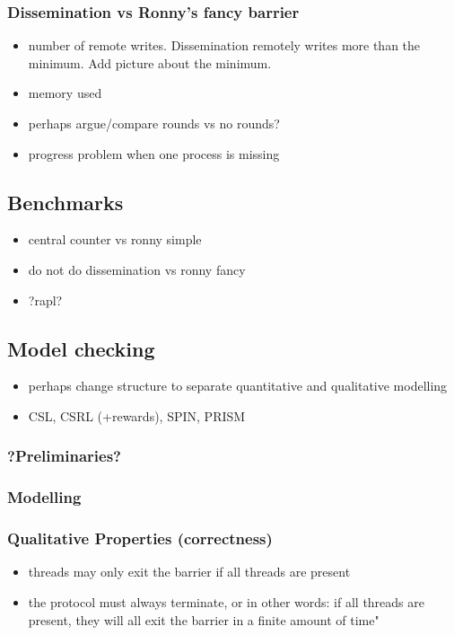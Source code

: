 \documentclass[a4paper, 10pt]{article}
\begin{document}
\subsubsection{Dissemination vs Ronny's fancy barrier}
\begin{itemize}
	\item number of remote writes. Dissemination remotely writes more than the minimum. Add picture about the minimum.
	\item memory used
	\item perhaps argue/compare rounds vs no rounds?
	\item progress problem when one process is missing
\end{itemize}

\subsection{Benchmarks}
\begin{itemize}
	\item central counter vs ronny simple
	\item do not do dissemination vs ronny fancy
	\item ?rapl?
\end{itemize}

\subsection{Model checking}
\begin{itemize}
	\item perhaps change structure to separate quantitative and qualitative modelling
	\item CSL\cite{assb96}, CSRL\cite{bhhk00} (+rewards), SPIN\cite{spin}\cite{hol97}, PRISM\cite{prism}\cite{knp09}
\end{itemize}

\subsubsection{?Preliminaries?}

\subsubsection{Modelling} %

\subsubsection{Qualitative Properties (correctness)}
\begin{itemize}
	\item threads may only exit the barrier if all threads are present
	\item the protocol must always terminate, or in other words: if all threads are present, they will all exit the barrier in a finite amount of time"
\end{itemize}
\end{document}
